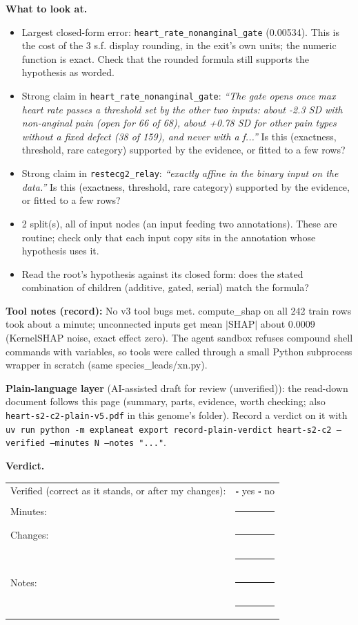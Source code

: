 \documentclass[a4paper,11pt]{article}
\begin{document}
\textbf{What to look at.}
\begin{itemize}
\item Largest closed-form error: \texttt{heart\_\allowbreak{}rate\_\allowbreak{}nonanginal\_\allowbreak{}gate} (0.00534). This is the cost of the 3 s.f. display rounding, in the exit's own units; the numeric function is exact. Check that the rounded formula still supports the hypothesis as worded.
\item Strong claim in \texttt{heart\_\allowbreak{}rate\_\allowbreak{}nonanginal\_\allowbreak{}gate}: \emph{``The gate opens once max heart rate passes a threshold set by the other two inputs: about -2.3 SD with non-anginal pain (open for 66 of 68), about +0.78 SD for other pain types without a fixed defect (38 of 159), and never with a f...''} Is this (exactness, threshold, rare category) supported by the evidence, or fitted to a few rows?
\item Strong claim in \texttt{restecg2\_\allowbreak{}relay}: \emph{``exactly affine in the binary input on the data.''} Is this (exactness, threshold, rare category) supported by the evidence, or fitted to a few rows?
\item 2 split(s), all of input nodes (an input feeding two annotations). These are routine; check only that each input copy sits in the annotation whose hypothesis uses it.
\item Read the root's hypothesis against its closed form: does the stated combination of children (additive, gated, serial) match the formula?
\end{itemize}
\textbf{Tool notes (record):} No v3 tool bugs met. compute\_\allowbreak{}shap on all 242 train rows took about a minute; unconnected inputs get mean $|$SHAP$|$ about 0.0009 (KernelSHAP noise, exact effect zero). The agent sandbox refuses compound shell commands with variables, so tools were called through a small Python subprocess wrapper in scratch (same species\_\allowbreak{}leads/\allowbreak{}xn.py)\allowbreak{}.

\textbf{Plain-language layer} (AI-assisted draft for review (unverified)): the read-down document follows this page (summary, parts, evidence, worth checking; also \texttt{heart-s2-c2-plain-v5.pdf} in this genome's folder). Record a verdict on it with \texttt{uv run python -m explaneat export record-plain-verdict heart-s2-c2 --verified --minutes N --notes "..."}.

\textbf{Verdict.}

\begin{tabularx}{\linewidth}{@{}lX@{}}
Verified (correct as it stands, or after my changes): & $\square$ yes \quad $\square$ no \\[4pt]
Minutes: & \rule{3cm}{0.4pt} \\[4pt]
Changes: & \rule{\linewidth}{0.4pt} \\[10pt]
 & \rule{\linewidth}{0.4pt} \\[4pt]
Notes: & \rule{\linewidth}{0.4pt} \\[10pt]
 & \rule{\linewidth}{0.4pt} \\
\end{tabularx}
\end{document}
